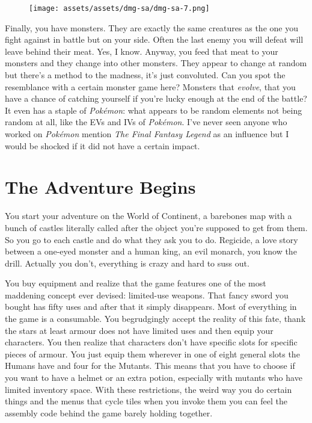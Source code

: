 \documentclass{book}
\begin{document}
\begin{figure}[hbt]
\vskip 10pt
\centering \texttt{[image: assets/assets/dmg-sa/dmg-sa-7.png]}
\vskip 6pt
\end{figure}
Finally, you have monsters. They are exactly the same creatures as the one you fight against in battle but on your side. Often the last enemy you will defeat will leave behind their meat. Yes, I know. Anyway, you feed that meat to your monsters and they change into other monsters. They appear to change at random but there’s a method to the madness, it’s just convoluted. Can you spot the resemblance with a certain monster game here? Monsters that \emph{evolve}, that you have a chance of catching yourself if you’re lucky enough at the end of the battle? It even has a staple of \emph{Pokémon}: what appears to be random elements not being random at all, like the EVs and IVs of \emph{Pokémon}. I’ve never seen anyone who worked on \emph{Pokémon} mention \emph{The Final Fantasy Legend} as an influence but I would be shocked if it did not have a certain impact.

\FloatBarrier\needspace{5pt}\section*{The Adventure Begins}\nopagebreak[4]

You start your adventure on the World of Continent, a barebones map with a bunch of castles literally called after the object you’re supposed to get from them. So you go to each castle and do what they ask you to do. Regicide, a love story between a one-eyed monster and a human king, an evil monarch, you know the drill. Actually you don’t, everything is crazy and hard to suss out.

You buy equipment and realize that the game features one of the most maddening concept ever devised: limited-use weapons. That fancy sword you bought has fifty uses and after that it simply disappears. Most of everything in the game is a consumable. You begrudgingly accept the reality of this fate, thank the stars at least armour does not have limited uses and then equip your characters. You then realize that characters don’t have specific slots for specific pieces of armour. You just equip them wherever in one of eight general slots the Humans have and four for the Mutants. This means that you have to choose if you want to have a helmet or an extra potion, especially with mutants who have limited inventory space. With these restrictions, the weird way you do certain things and the menus that cycle tiles when you invoke them you can feel the assembly code behind the game barely holding together.
\end{document}
